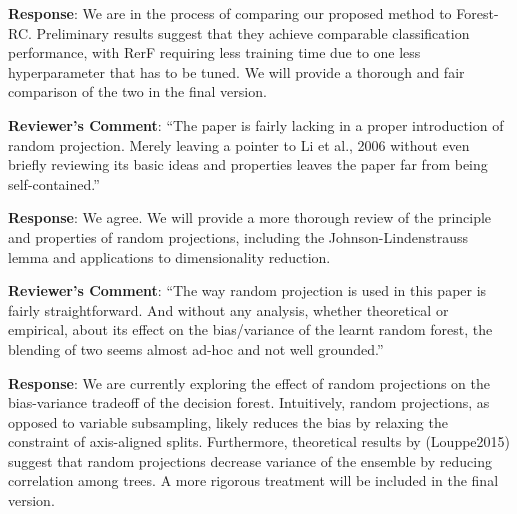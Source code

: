 \documentclass{article}
\begin{document}
\textbf{Response}: We are in the process of comparing our proposed method to Forest-RC. Preliminary results suggest that they achieve comparable classification performance, with RerF requiring less training time due to one less hyperparameter that has to be tuned. We will provide a thorough and fair comparison of the two in the final version. 

\textbf{Reviewer's Comment}: ``The paper is fairly lacking in a proper introduction of random projection. Merely leaving a pointer to Li et al., 2006 without even briefly reviewing its basic ideas and properties leaves the paper far from being self-contained.''

\textbf{Response}: We agree. We will provide a more thorough review of the principle and properties of random projections, including the Johnson-Lindenstrauss lemma and applications to dimensionality reduction.

\textbf{Reviewer's Comment}: ``The way random projection is used in this paper is fairly straightforward. And without any analysis, whether theoretical or empirical, about its effect on the bias/variance of the learnt random forest, the blending of two seems almost ad-hoc and not well grounded.''

\textbf{Response}: We are currently exploring the effect of random projections on the bias-variance tradeoff of the decision forest. Intuitively, random projections, as opposed to variable subsampling, likely reduces the bias by relaxing the constraint of axis-aligned splits. Furthermore, theoretical results by (Louppe2015) suggest that random projections decrease variance of the ensemble by reducing correlation among trees. A more rigorous treatment will be included in the final version.
\end{document}
